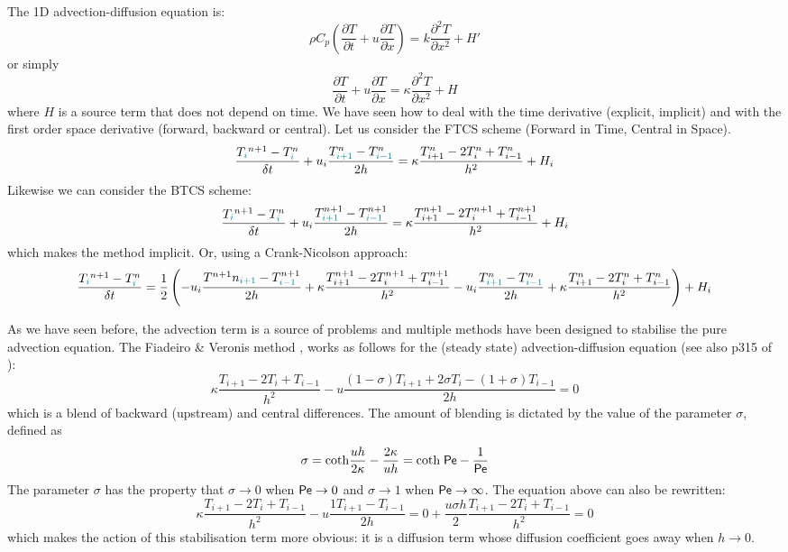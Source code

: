 The 1D advection-diffusion equation is:
\begin{equation}
\rho C_p \left( \frac{\partial T}{\partial t}  
+ u \frac{\partial T}{\partial x} \right)= k \frac{\partial^2 T}{\partial x^2} + H'
\end{equation}
or simply
\begin{equation}
\frac{\partial T}{\partial t} + u \frac{\partial T}{\partial x}= \kappa \frac{\partial^2 T}{\partial x^2} + H
\end{equation}
where $H$ is a source term that does not depend on time.
We have seen how to deal with the time derivative (explicit, implicit) 
and with the first order space derivative (forward, backward or central).
Let us consider the FTCS scheme (Forward in Time, Central in Space).
\[
\frac{T_{\color{teal}i}^{n+1}-T^n_{\color{teal}i}}{\delta t} 
+ u_i \frac{T^n_{\color{teal}i+1} - T^n_{{\color{teal}i-1}}}{2h} = \kappa \frac{T_{i+1}^n-2T_i^n+T_{i-1}^n}{h^2} + H_i
\]
Likewise we can consider the BTCS scheme:
\[
\frac{T_{\color{teal}i}^{n+1}-T^n_{\color{teal}i}}{\delta t} 
+ u_i \frac{T^{n+1}_{\color{teal}i+1} - T^{n+1}_{{\color{teal}i-1}}}{2h} 
= \kappa \frac{T_{i+1}^{n+1}-2T_i^{n+1}+T_{i-1}^{n+1}}{h^2} + H_i
\]
which makes the method implicit. 
Or, using a Crank-Nicolson approach:
\[
\frac{T_{\color{teal}i}^{n+1}-T^n_{\color{teal}i}}{\delta t} 
=
\frac12
\left(
- u_i \frac{T^{n+1}n_{\color{teal}i+1} - T^{n+1}_{{\color{teal}i-1}}}{2h} 
+ \kappa \frac{T_{i+1}^{n+1}-2T_i^{n+1}+T_{i-1}^{n+1}}{h^2} 
- u_i \frac{T^n_{\color{teal}i+1} - T^n_{{\color{teal}i-1}}}{2h} + \kappa \frac{T_{i+1}^n-2T_i^n+T_{i-1}^n}{h^2} 
\right)
+ H_i
\]




As we have seen before, the advection term is a source of problems and multiple 
methods have been designed to stabilise the pure advection equation. 
The {\color{olive}Fiadeiro \& Veronis method} \cite{five77,wrig92}, works as follows for the (steady state)
advection-diffusion equation (see also p315 of \textcite{boudreau}):
\[
\kappa \frac{T_{i+1}-2T_i + T_{i-1}}{h^2}
- u \frac{(1-\sigma) T_{i+1}+2\sigma T_i -(1+\sigma)T_{i-1}}{2 h} = 0
\]
which is a blend of backward (upstream) and central differences. The amount of
blending is dictated by the value of the parameter $\sigma$, defined as
\[
\sigma 
= \text{coth} \frac{u h}{2 \kappa} - \frac{2 \kappa}{u h}
= \text{coth} \; {\mathsf{Pe}}  - \frac{1}{{\mathsf{Pe}}}
\]
The parameter $\sigma$ has the property that
$\sigma \rightarrow 0$ when ${\mathsf{Pe}} \rightarrow 0$ and 
$\sigma \rightarrow 1$ when ${\mathsf{Pe}} \rightarrow \infty$.
The equation above can also be rewritten:
\[
\kappa \frac{T_{i+1}-2T_i + T_{i-1}}{h^2}
- u \frac{1 T_{i+1}-T_{i-1}}{2 h} = 0
+ \frac{u \sigma h}{2} \frac{T_{i+1}-2 T_i +T_{i-1}}{h^2} = 0
\]
which makes the action of this stabilisation term more obvious: it is a diffusion term whose 
diffusion coefficient goes away when $h\rightarrow 0$. 

